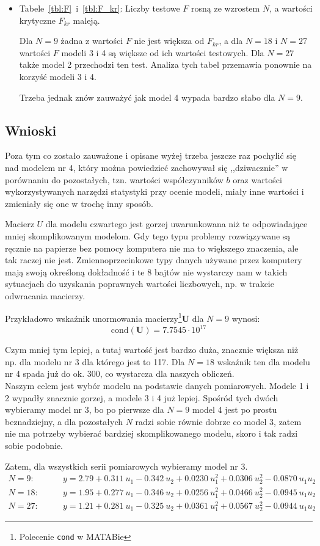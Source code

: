\documentclass[11pt, a4paper]{article}
\begin{document}
\begin{itemize}
\item Tabele~\ref{tbl:F}~i~\ref{tbl:F_kr}: Liczby testowe $F$ rosną ze wzrostem $N$, a wartości krytyczne $F_{kr}$ maleją.

Dla $N = 9$ żadna z wartości $F$ nie jest większa od $F_{kr}$, a dla $N = 18$ i $N = 27$ wartości $F$ modeli 3 i 4 są większe od ich wartości testowych. Dla $N = 27$ także model 2 przechodzi ten test. Analiza tych tabel przemawia ponownie na korzyść modeli 3 i 4.

Trzeba jednak znów zauważyć jak model 4 wypada bardzo słabo dla $N = 9$.
\end{itemize}

\subsection{Wnioski}

Poza tym co zostało zauważone i opisane wyżej trzeba jeszcze raz pochylić się nad modelem nr 4, który można powiedzieć zachowywał się ,,dziwacznie'' w porównaniu do pozostałych, tzn. wartości współczynników $b$ oraz wartości wykorzystywanych narzędzi statystyki przy ocenie modeli, miały inne wartości i zmieniały się one w trochę inny sposób.

Macierz $U$ dla modelu czwartego jest gorzej uwarunkowana niż te odpowiadające mniej skomplikowanym modelom. Gdy tego typu problemy rozwiązywane są ręcznie na papierze bez pomocy komputera nie ma to większego znaczenia, ale tak raczej nie jest. Zmiennoprzecinkowe typy danych używane przez komputery mają swoją określoną dokładność i te 8 bajtów nie wystarczy nam w takich sytuacjach do uzyskania poprawnych wartości liczbowych, np. w trakcie odwracania macierzy.

Przykładowo wskaźnik unormowania macierzy\footnote{Polecenie \texttt{cond} w MATABie}$\mathbf{U}$ dla $N = 9$ wynosi:
\[
	\text{cond} (\mathbf{U}) = 7.7545 \cdot 10^{17}
\]

Czym mniej tym lepiej, a tutaj wartość jest bardzo duża, znacznie większa niż np. dla modelu nr 3 dla którego jest to 117. Dla $N = 18$ wskaźnik ten dla modelu nr 4 spada już do ok. 300, co wystarcza dla naszych obliczeń.\\

Naszym celem jest wybór modelu na podstawie danych pomiarowych. Modele 1 i 2 wypadły znacznie gorzej, a modele 3 i 4 już lepiej. Spośród tych dwóch wybieramy model nr 3, bo po pierwsze dla $N = 9$ model 4 jest po prostu beznadziejny, a dla pozostałych $N$ radzi sobie równie dobrze co model 3, zatem nie ma potrzeby wybierać bardziej skomplikowanego modelu, skoro i tak radzi sobie podobnie.

Zatem, dla wszystkich serii pomiarowych wybieramy model nr 3.
\begin{align*}
	N = 9:& \qquad
	y = 2.79 + 0.311 \ u_1 - 0.342 \ u_2 +
		0.0230 \ u_1^2 + 0.0306 \ u_2^2 - 0.0870 \ u_1 u_2 \\
	N = 18:& \qquad
	y = 1.95 + 0.277 \ u_1 -0.346 \ u_2 +
		0.0256 \ u_1^2 + 0.0466 \ u_2^2 - 0.0945 \ u_1 u_2 \\
	N = 27:& \qquad
	y = 1.21 + 0.281 \ u_1 - 0.325 \ u_2 +
		0.0361 \ u_1^2 + 0.0567 \ u_2^2 - 0.0944 \ u_1 u_2
\end{align*}
\end{document}
